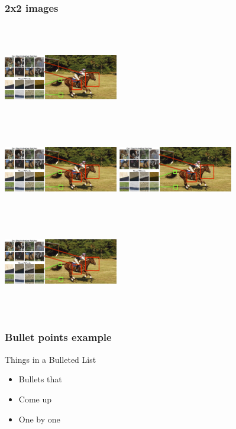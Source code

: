 \documentclass[serif,14pt]{beamer}
\begin{document}
\begin{frame}
  \frametitle{2x2 images}

\begin{columns}[t]
\centering
\includegraphics[width=5cm,height=4cm]{patches.jpg}\\
\includegraphics[width=5cm,height=4cm]{patches.jpg}
\centering
\includegraphics[width=5cm,height=4cm]{patches.jpg}\\
\includegraphics[width=5cm,height=4cm]{patches.jpg}
\end{columns}
\end{frame}

\begin{frame}
  \frametitle{Bullet points example}
  Things in a Bulleted List\pause
  \begin{itemize}
  \item Bullets that\pause
  \item Come up\pause
  \item One by one %
  \end{itemize}
\end{frame}
\end{document}
